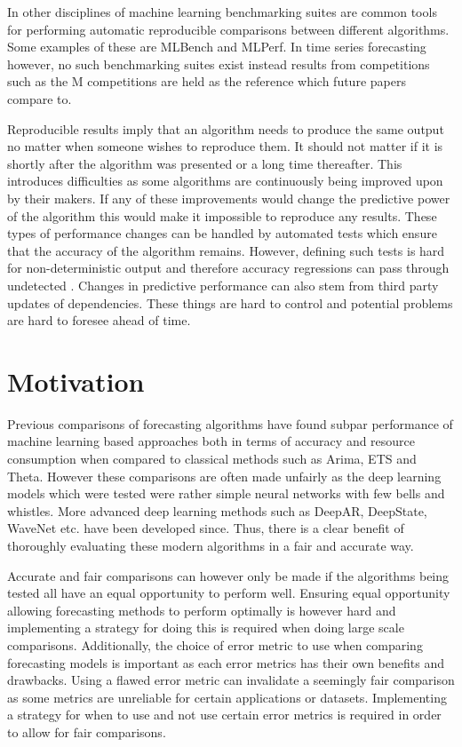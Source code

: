 In other disciplines of machine learning benchmarking suites are common tools for performing automatic reproducible comparisons between different algorithms. Some examples of these are MLBench and MLPerf. In time series forecasting however, no such benchmarking suites exist instead results from competitions such as the M competitions  are held as the reference which future papers compare to. 

Reproducible results imply that an algorithm needs to produce the same output no matter when someone wishes to reproduce them. It should not matter if it is shortly after the algorithm was presented or a long time thereafter. This introduces difficulties as some algorithms are continuously being improved upon by their makers. If any of these improvements would change the predictive power of the algorithm this would make it impossible to reproduce any results. These types of performance changes can be handled by automated tests which ensure that the accuracy of the algorithm remains. However, defining such tests is hard for non-deterministic output and therefore accuracy regressions can pass through undetected \cite{gluonts_deepar_github_issue}. Changes in predictive performance can also stem from third party updates of dependencies. These things are hard to control and potential problems are hard to foresee ahead of time. 



\section{Motivation}
Previous comparisons of forecasting algorithms have found subpar performance of machine learning based approaches both in terms of accuracy and resource consumption when compared to classical methods such as Arima, ETS and Theta. However these comparisons are often made unfairly as the deep learning models which were tested were rather simple neural networks with few bells and whistles. More advanced deep learning methods such as DeepAR, DeepState, WaveNet etc. have been developed since. Thus, there is a clear benefit of thoroughly evaluating these modern algorithms in a fair and accurate way. 

Accurate and fair comparisons can however only be made if the algorithms being tested all have an equal opportunity to perform well. Ensuring equal opportunity allowing forecasting methods to perform optimally is however hard and implementing a strategy for doing this is required when doing large scale comparisons. Additionally, the choice of error metric to use when comparing forecasting models is important as each error metrics has their own benefits and drawbacks. Using a flawed error metric can invalidate a seemingly fair comparison as some metrics are unreliable for certain applications or datasets. Implementing a strategy for when to use and not use certain error metrics is required in order to allow for fair comparisons.


